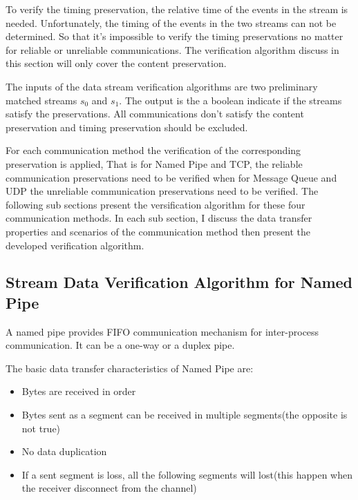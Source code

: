 To verify the timing preservation, the relative time of the events in the stream is needed. Unfortunately, the timing of the events in the two streams can not be determined. So that it's impossible to verify the timing preservations no matter for reliable or unreliable communications. The verification algorithm discuss in this section will only cover the content preservation.  

The inputs of the data stream verification algorithms are two preliminary matched streams $s_0$ and $s_1$. The output is the a boolean indicate if the streams satisfy the preservations. All communications don't satisfy the content preservation and timing preservation should be excluded.

For each communication method the verification of the corresponding preservation is applied, That is for Named Pipe and TCP,  the reliable communication preservations need to be verified when for Message Queue and UDP the unreliable communication preservations need to be verified. The following sub sections present the versification  algorithm for these four communication methods. In each sub section, I discuss the data transfer properties and scenarios of the communication method then present the developed verification algorithm.

\subsection{Stream Data Verification Algorithm for Named Pipe}
A named pipe provides FIFO communication mechanism for inter-process communication. It can be a one-way or a duplex pipe. \cite{khambattinamed}

The basic data transfer characteristics of Named Pipe are:
\begin{itemize}
  \item Bytes are received in order
  \item Bytes sent as a segment can be received in multiple segments(the opposite is not true)
  \item No data duplication
  \item If a sent segment is loss, all the following segments will lost(this happen when the receiver disconnect from the channel) 
  
\end{itemize}

